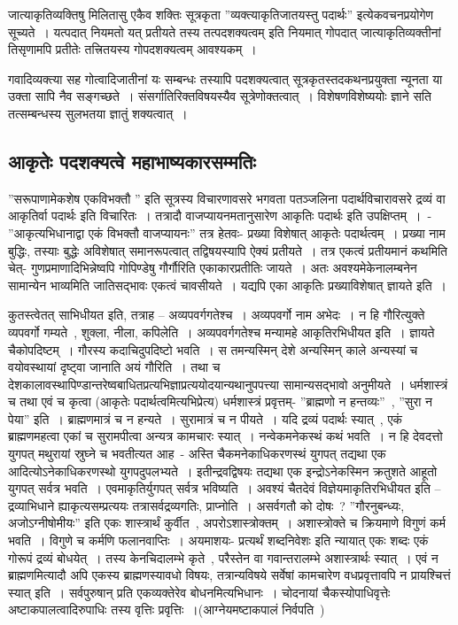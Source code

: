 		जात्याकृतिव्यक्तिषु मिलितासु एकैव शक्तिः सूत्रकृता ”व्यक्त्याकृतिजातयस्तु पदार्थः” इत्येकवचनप्रयोगेण सूच्यते~।  यत्पदात् नियमतो यत् प्रतीयते तस्य तत्पदशक्यत्वम् इति नियमात् गोपदात् जात्याकृतिव्यक्तीनां तिसृणामपि प्रतीतेः तत्त्रितयस्य गोपदशक्यत्वम् आवश्यकम्~। 

		गवादिव्यक्त्या सह गोत्वादिजातीनां यः सम्बन्धः तस्यापि पदशक्यत्वात् सूत्रकृतस्तदकथनप्रयुक्ता न्यूनता या उक्ता सापि नैव सङ्गच्छते~। संसर्गातिरिक्तविषयस्यैव सूत्रेणोक्तत्वात्~। विशेषणविशेष्ययोः ज्ञाने सति तत्सम्बन्धस्य सुलभतया ज्ञातुं शक्यत्वात्~।

		\subsection{आकृतेः पदशक्यत्वे महाभाष्यकारसम्मतिः}

		”सरूपाणामेकशेष एकविभक्तौ ” इति सूत्रस्य विचारणावसरे भगवता पतञ्जलिना पदार्थविचारावसरे द्रव्यं वा आकृतिर्वा पदार्थः इति  विचारितः~। तत्रादौ वाजप्यायनमतानुसारेण  आकृतिः पदार्थः इति उपक्षिप्तम्~।~- ”आकृत्यभिधानाद्वा एकं विभक्तौ वाजप्यायनः” तत्र हेतवः- प्रख्या विशेषात् आकृतेः पदार्थत्वम्~। प्रख्या नाम बुद्धिः, तस्याः बुद्धेः अविशेषात् समानरूपत्वात्  तद्विषयस्यापि ऐक्यं  प्रतीयते~। तत्र एकत्वं प्रतीयमानं कथमिति चेत्-  गुणप्रमाणादिभिन्नेष्वपि  गोपिण्डेषु  गौर्गौरिति एकाकारप्रतीतिः जायते~। अतः अवश्यमेकेनालम्बनेन सामान्येन  भाव्यमिति जातिसद्भावः एकत्वं चावसीयते~। यद्यपि एका आकृतिः प्रख्याविशेषात् ज्ञायते इति~। 
			
		कुतस्त्वेतत् साभिधीयत इति, तत्राह – अव्यपवर्गगतेश्च~। अव्यपवर्गो नाम अभेदः~। न हि गौरित्युक्ते व्यपवर्गो गम्यते~, शुक्ला, नीला, कपिलेति~। अव्यपवर्गगतेश्च मन्यामहे आकृतिरभिधीयत इति~। ज्ञायते चैकोपदिष्टम्~। गौरस्य कदाचिदुपदिष्टो भवति~। स तमन्यस्मिन् देशे अन्यस्मिन्  काले अन्यस्यां च वयोवस्थायां  दृष्ट्वा जानाति  अयं गौरिति~। तथा च देशकालावस्थापिण्डान्तरेष्वबाधितप्रत्यभिज्ञाप्रत्ययोदयान्यथानुपपत्त्या  सामान्यसद्भावो अनुमीयते~। धर्मशास्त्रं च तथा एवं च कृत्वा (आकृतेः पदार्थत्वमित्यभिप्रेत्य) धर्मशास्त्रं प्रवृत्तम्- ”ब्राह्मणो न हन्तव्यः”~, ”सुरा न पेया” इति~।  ब्राह्मणमात्रं च  न हन्यते~। सुरामात्रं च न पीयते~। यदि द्रव्यं पदार्थः  स्यात्~, एकं ब्राह्मणमहत्वा  एकां च सुरामपीत्वा अन्यत्र  कामचारः स्यात्~। नन्वेकमनेकस्थं कथं भवति~।  न हि देवदत्तो  युगपत् मथुरायां  स्रुघ्ने च भवतीत्यत आह~- अस्ति चैकमनेकाधिकरणस्थं  युगपत् तद्यथा  एक  आदित्योऽनेकाधिकरणस्थो  युगपदुपलभ्यते~। इतीन्द्रवद्विषयः तद्यथा एक इन्द्रोऽनेकस्मिन क्रतुशते आहूतो युगपत्  सर्वत्र  भवति~। एवमाकृतिर्युगपत्  सर्वत्र भविष्यति~। अवश्यं चैतदेवं विज्ञेयमाकृतिरभिधीयत इति – द्रव्याभिधाने ह्याकृत्यसम्प्रत्ययः  तत्रासर्वद्रव्यगतिः,  प्राप्नोति~। असर्वगतौ को दोषः~? ”गौरनुबन्ध्यः, अजोऽग्नीषोमीयः” इति एकः शास्त्रार्थं कुर्वीत~, अपरोऽशास्त्रोक्तम्~। अशास्त्रोक्ते च क्रियमाणे  विगुणं कर्म भवति~। विगुणे च कर्मणि फलानवाप्तिः~। अयमाशयः- प्रत्यर्थं शब्दनिवेशः इति न्यायात् एकः शब्दः एकं गोरूपं द्रव्यं बोधयेत्~। तस्य केनचिदालम्भे कृते~, परैस्तेन वा गवान्तरालम्भे अशास्त्रार्थः स्यात्~। एवं न ब्राह्मणमित्यादौ अपि एकस्य ब्राह्मणस्यावधो विषयः, तत्रान्यविषये सर्वेषां कामचारेण वधप्रवृत्तावपि न प्रायश्चित्तं स्यात् इति~। सर्वपुरुषान् प्रति एकव्यक्तेरेव बोधनमित्यभिधानः~। चोदनायां चैकस्योपाधिवृत्तेः अष्टाकपालत्वादिरुपाधिः तस्य वृत्तिः प्रवृत्तिः~।(आग्नेयमष्टाकपालं निर्वपति~) 
			

